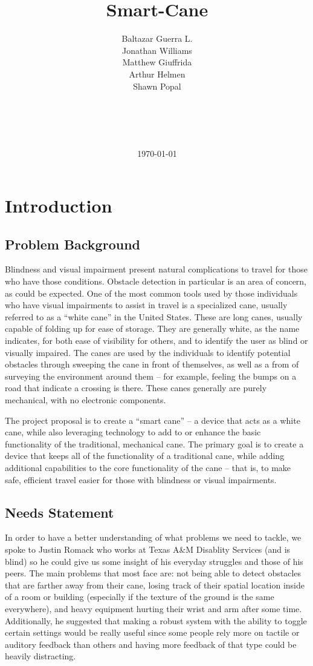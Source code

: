 \documentclass[letterpaper,12pt]{article}
\title{\textbf{\Huge Smart-Cane}}
\author{Baltazar Guerra L.\\ Jonathan Williams \\ Matthew Giuffrida \\ Arthur Helmen \\ Shawn Popal \\ \\ \\ \\ \\}
\date{\today}
\begin{document}
\maketitle
\newpage

\tableofcontents
\newpage

\section{Introduction}
\subsection{Problem Background}

Blindness and visual impairment present natural complications to travel for those who have those conditions. Obstacle detection in particular is an area of concern, as could be expected. One of the most common tools used by those individuals who have visual impairments to assist in travel is a specialized cane, usually referred to as a “white cane” in the United States. These are long canes, usually capable of folding up for ease of storage. They are generally white, as the name indicates, for both ease of visibility for others, and to identify the user as blind or visually impaired. The canes are used by the individuals to identify potential obstacles through sweeping the cane in front of themselves, as well as a from of surveying the environment around them – for example, feeling the bumps on a road that indicate a crossing is there. These canes generally are purely mechanical, with no electronic components. \par

The project proposal is to create a “smart cane” – a device that acts as a white cane, while also leveraging technology to add to or enhance the basic functionality of the traditional, mechanical cane. The primary goal is to create a device that keeps all of the functionality of a traditional cane, while adding additional capabilities to the core functionality of the cane – that is, to make safe, efficient travel easier for those with blindness or visual impairments. \par

\subsection{Needs Statement}
In order to have a better understanding of what problems we need to tackle, we spoke to Justin Romack who works at Texas A\&M Disablity Services (and is blind) so he could give us some insight of his everyday struggles and those of his peers. The main problems that most face are: not being able to detect obstacles that are farther away from their cane, losing track of their spatial location inside of a room or building (especially if the texture of the ground is the same everywhere), and heavy equipment hurting their wrist and arm after some time. Additionally, he suggested that making a robust system with the ability to toggle certain settings would be really useful since some people rely more on tactile or auditory feedback than others and having more feedback of that type could be heavily distracting.
\end{document}
